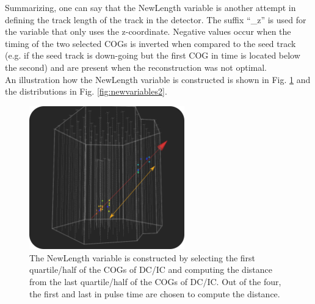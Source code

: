 \noindent Summarizing, one can say that the NewLength variable is another attempt in defining the track length of the track in the detector. The suffix ``\_z'' is used for the variable that only uses the z-coordinate. Negative values occur when the timing of the two selected COGs is inverted when compared to the seed track (e.g. if the seed track is down-going but the first COG in time is located below the second) and are present when the reconstruction was not optimal.\\

\noindent An illustration how the NewLength variable is constructed is shown in Fig. \ref{fig:newlength} and the distributions in Fig. \ref{fig:newvariables2}.

\begin{figure}
\centering
\includegraphics[width=0.6\textwidth]{chapter8/img/newlengthillustration_extra.png}
\caption{The NewLength variable is constructed by selecting the first quartile/half of the COGs of DC/IC and computing the distance from the last quartile/half of the COGs of DC/IC. Out of the four, the first and last in pulse time are chosen to compute the distance.}
\label{fig:newlength}
\end{figure}
 

